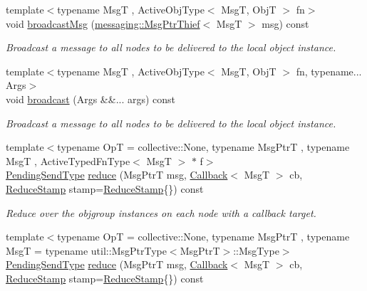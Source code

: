 \begin{DoxyCompactItemize}
{\footnotesize template$<$typename MsgT , Active\+Obj\+Type$<$ Msg\+T, Obj\+T $>$ fn$>$ }\\void \hyperlink{structvt_1_1objgroup_1_1proxy_1_1_proxy_adf7096198908bb265516b3206452d73a}{broadcast\+Msg} (\hyperlink{structvt_1_1messaging_1_1_msg_ptr_thief}{messaging\+::\+Msg\+Ptr\+Thief}$<$ MsgT $>$ msg) const
\begin{DoxyCompactList}\small\item\em Broadcast a message to all nodes to be delivered to the local object instance. \end{DoxyCompactList}\item 
{\footnotesize template$<$typename MsgT , Active\+Obj\+Type$<$ Msg\+T, Obj\+T $>$ fn, typename... Args$>$ }\\void \hyperlink{structvt_1_1objgroup_1_1proxy_1_1_proxy_ad4f1ddeb5b09f01643b17a93bbbe82e9}{broadcast} (Args \&\&... args) const
\begin{DoxyCompactList}\small\item\em Broadcast a message to all nodes to be delivered to the local object instance. \end{DoxyCompactList}\item 
{\footnotesize template$<$typename OpT  = collective\+::\+None, typename Msg\+PtrT , typename MsgT , Active\+Typed\+Fn\+Type$<$ Msg\+T $>$ $\ast$ f$>$ }\\\hyperlink{structvt_1_1objgroup_1_1proxy_1_1_proxy_a1bdf8713203531d306702a024872bb08}{Pending\+Send\+Type} \hyperlink{structvt_1_1objgroup_1_1proxy_1_1_proxy_a61273d407174fb496b4aed10ec6650bd}{reduce} (Msg\+PtrT msg, \hyperlink{namespacevt_a36db99df4c973d48b1118a293fff533f}{Callback}$<$ MsgT $>$ cb, \hyperlink{structvt_1_1objgroup_1_1proxy_1_1_proxy_a337be4c20cf11ff6477c7a66208cc909}{Reduce\+Stamp} stamp=\hyperlink{structvt_1_1objgroup_1_1proxy_1_1_proxy_a337be4c20cf11ff6477c7a66208cc909}{Reduce\+Stamp}\{\}) const
\begin{DoxyCompactList}\small\item\em Reduce over the objgroup instances on each node with a callback target. \end{DoxyCompactList}\item 
{\footnotesize template$<$typename OpT  = collective\+::\+None, typename Msg\+PtrT , typename MsgT  = typename util\+::\+Msg\+Ptr\+Type$<$\+Msg\+Ptr\+T$>$\+::\+Msg\+Type$>$ }\\\hyperlink{structvt_1_1objgroup_1_1proxy_1_1_proxy_a1bdf8713203531d306702a024872bb08}{Pending\+Send\+Type} \hyperlink{structvt_1_1objgroup_1_1proxy_1_1_proxy_adf7063db97ee8f694b5a677abd2f8543}{reduce} (Msg\+PtrT msg, \hyperlink{namespacevt_a36db99df4c973d48b1118a293fff533f}{Callback}$<$ MsgT $>$ cb, \hyperlink{structvt_1_1objgroup_1_1proxy_1_1_proxy_a337be4c20cf11ff6477c7a66208cc909}{Reduce\+Stamp} stamp=\hyperlink{structvt_1_1objgroup_1_1proxy_1_1_proxy_a337be4c20cf11ff6477c7a66208cc909}{Reduce\+Stamp}\{\}) const

\end{DoxyCompactItemize}
